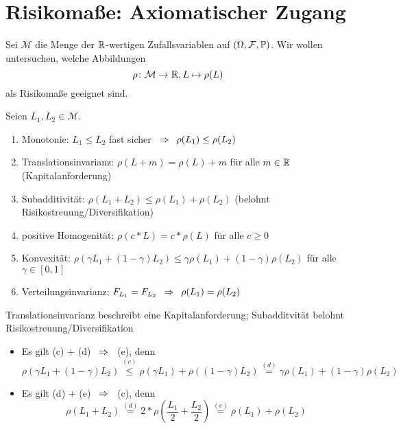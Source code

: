 \section{Risikomaße: Axiomatischer Zugang}

Sei $\mathcal{M}$ die Menge der $\mathbb{R}$-wertigen Zufallsvariablen auf $(\Omega, \mathcal{F}, \mathbb{P})$. Wir wollen untersuchen, welche Abbildungen 
\begin{equation*}
	\abb{\rho}{\mathcal{M}}{\R}, L \mapsto \rho(L)
\end{equation*}
als Risikomaße geeignet sind.

\begin{*definition}
	Seien $L_1, L_2 \in \mathcal{M}$.
	\begin{enumerate}[label=(\alph*), nolistsep]
		\item Monotonie: $L_1 \le L_2$ fast sicher $\enskip \Rightarrow \enskip \rho(L_1) \le \rho(L_2)$
		\item Translationsinvarianz: $\rho(L + m) = \rho(L) + m$ für alle $m \in \mathbb{R}$ (Kapitalanforderung)
		\item Subadditivität: $\rho(L_1 + L_2) \le \rho(L_1) + \rho(L_2)$ (belohnt Risikostreuung/Diversifikation)
		\item positive Homogenität: $\rho(c * L) = c * \rho(L)$ für alle $c \ge 0$
		\item Konvexität: $\rho(\gamma L_1 + (1-\gamma) L_2) \le \gamma \rho(L_1) + (1-\gamma) \rho(L_2)$ für alle $\gamma \in [0,1]$
		\item Verteilungsinvarianz: $F_{L_1} = F_{L_2} \enskip \Rightarrow \enskip \rho(L_1) = \rho(L_2)$
	\end{enumerate}
\end{*definition}

\begin{*bemerkung_inline}
	Translationsinvarianz beschreibt eine Kapitalanforderung; Subadditvität belohnt Risikostreuung/Diversifikation
	\begin{itemize}[nolistsep]
		\item Es gilt (c) $+$ (d) $\enskip \Rightarrow \enskip$ (e), denn
		\begin{equation*}
			\rho(\gamma L_1 + (1-\gamma) L_2) \overset{(c)}{\le} \rho(\gamma L_1) + \rho((1-\gamma) L_2) \overset{(d)}{=} \gamma \rho(L_1) + (1-\gamma) \rho(L_2)
		\end{equation*}
		\item Es gilt (d) $+$ (e) $\enskip \Rightarrow \enskip$ (c), denn
		\begin{equation*}
			\rho(L_1 + L_2) \overset{(d)}{=} 2 * \rho(\frac{L_1}{2} + \frac{L_2}{2}) \overset{(e)}{=} \rho(L_1) + \rho(L_2)
		\end{equation*}
	\end{itemize}
\end{*bemerkung_inline}

